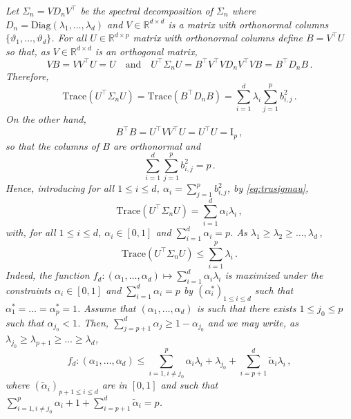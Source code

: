 \documentclass[a4paper,10pt,fleqn]{article}
\newcommand{\eqsp}{\,}
\newcommand{\rset}{\ensuremath{\mathbb{R}}}
\newcommand{\1}{\ensuremath{\mathbbm{1}}}
\newcommand{\bfU}{U}
\newcommand{\bfs}{\Sigma}
\newcommand{\bfV}{V}
\newcommand{\bfB}{B}
\newcommand{\bfI}{\mathrm{I}}
\newcommand{\bfD}{D}
\begin{document}
\begin{enumerate}
{\em
 Let $\bfs_n = \bfV\bfD_n\bfV^\top$ be the spectral decomposition of $\bfs_n$ where $\bfD_n = \mathrm{Diag}(\lambda_1,\ldots,\lambda_d)$ and $\bfV\in\rset^{d\times d}$  is a matrix with orthonormal columns $\{\vartheta_1,\ldots,\vartheta_d\}$. For all  $\bfU\in\rset^{d\times p}$ matrix with orthonormal columns define $\bfB = \bfV^\top\bfU$ so that, as $\bfV\in\rset^{d\times d}$ is an orthogonal matrix,
$$
\bfV\bfB = \bfV\bfV^\top\bfU = \bfU\quad\mathrm{and}\quad \bfU^\top\bfs_n \bfU = \bfB^\top\bfV^\top\bfV\bfD_n\bfV^\top\bfV\bfB = \bfB^\top\bfD_n\bfB\eqsp.
$$
Therefore,
\begin{equation}
\label{eq:trusigmau}
\mathrm{Trace}(\bfU^\top\bfs_n \bfU) = \mathrm{Trace}(\bfB^\top\bfD_n\bfB) = \sum_{i = 1}^d \lambda_i \sum_{j=1}^p b^2_{i,j}\eqsp.
\end{equation}
On the other hand,
$$
\bfB^\top\bfB = \bfU^\top\bfV\bfV^\top\bfU = \bfU^\top\bfU = \bfI_p\eqsp,
$$
so that the columns of $\bfB$ are orthonormal and
$$
\sum_{i = 1}^d \sum_{j=1}^p b^2_{i,j} = p\eqsp.
$$
Hence, introducing for all $1\leqslant i \leqslant d$, $\alpha_i =  \sum_{j=1}^p b^2_{i,j}$, by \eqref{eq:trusigmau},
$$
\mathrm{Trace}(\bfU^\top\bfs_n \bfU) = \sum_{i=1}^{d}\alpha_i\lambda_i\eqsp,
$$
with, for all $1\leqslant i\leqslant d$, $\alpha_i \in[0,1]$ and $\sum_{i=1}^d\alpha_i  = p$. As $\lambda_1 \geqslant \lambda_2\geqslant \ldots, \lambda_d$\eqsp,
$$
\mathrm{Trace}(\bfU^\top\bfs_n \bfU) \leqslant \sum_{i=1}^{p}\lambda_i\eqsp.
$$
Indeed, the function $f_d:(\alpha_1,\ldots,\alpha_d)\mapsto\sum_{i=1}^{d}\alpha_i\lambda_i$ is maximized under the constraints   $\alpha_i \in[0,1]$ and $\sum_{i=1}^d\alpha_i  = p$ by $(\alpha^*_i)_{1\leqslant i \leqslant d}$ such that $\alpha^*_1=\ldots=\alpha^*_p=1$. Assume that $(\alpha_1,\ldots,\alpha_d)$ is such that there exists $1\leqslant j_0\leqslant p$ such that $\alpha_{j_0}<1$. Then, $\sum_{j=p+1}^d\alpha_j \geqslant 1 - \alpha_{j_0}$ and we may write, as $\lambda_{j_0}\geqslant \lambda_{p+1}\geqslant \ldots\geqslant \lambda_d$,
$$
f_d:(\alpha_1,\ldots,\alpha_d) \leqslant \sum_{i=1, i\neq j_0}^{p}\alpha_i\lambda_i + \lambda_{j_0} + \sum_{i=p+1}^{d}\tilde \alpha_i\lambda_i \eqsp,
$$
where $(\tilde \alpha_i)_{p+1\leqslant i\leqslant d}$ are in $[0,1]$ and such that $ \sum_{i=1, i\neq j_0}^{p}\alpha_i + 1 +  \sum_{i=p+1}^{d}\tilde\alpha_i = p$.


}
\end{enumerate}
\end{document}

